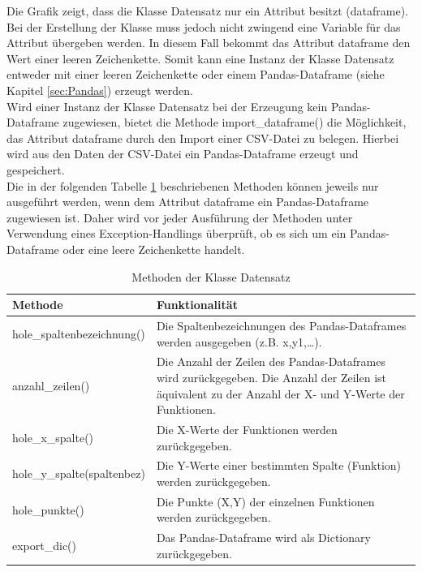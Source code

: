 \documentclass[11pt,a4paper]{scrreprt}
\begin{document}
Die Grafik zeigt, dass die Klasse Datensatz nur ein Attribut besitzt (dataframe). Bei der Erstellung der Klasse muss jedoch nicht zwingend eine Variable für das Attribut übergeben werden. In diesem Fall bekommt das Attribut dataframe den Wert einer leeren Zeichenkette. Somit kann eine Instanz der Klasse Datensatz entweder mit einer leeren Zeichenkette oder einem Pandas-Dataframe (siehe Kapitel \ref{sec:Pandas}) erzeugt werden. \\
Wird einer Instanz der Klasse Datensatz bei der Erzeugung kein Pandas-Dataframe zugewiesen, bietet die Methode import\_dataframe() die Möglichkeit, das Attribut dataframe durch den Import einer CSV-Datei zu belegen. Hierbei wird aus den Daten der CSV-Datei ein Pandas-Dataframe erzeugt und gespeichert.\\
Die in der folgenden Tabelle \ref{tab:Klasse_Datensatz} beschriebenen Methoden können jeweils nur ausgeführt werden, wenn dem Attribut dataframe ein Pandas-Dataframe zugewiesen ist. Daher wird vor jeder Ausführung der Methoden unter Verwendung eines Exception-Handlings überprüft, ob es sich um ein Pandas-Dataframe oder eine leere Zeichenkette handelt. 
\begin{table}[!h]
\centering
\begin{tabularx}{0.95\textwidth}{|l|X|}
\hline
\textbf{Methode} & \textbf{Funktionalität}\\
\hline
hole\_spaltenbezeichnung() & Die Spaltenbezeichnungen des Pandas-Dataframes werden ausgegeben (z.B. x,y1,…).\\
\hline
anzahl\_zeilen() & Die Anzahl der Zeilen des Pandas-Dataframes wird zurückgegeben. Die Anzahl der Zeilen ist äquivalent zu der Anzahl der X- und Y-Werte der Funktionen.\\
\hline
hole\_x\_spalte() & Die X-Werte der Funktionen werden zurückgegeben.\\
\hline
hole\_y\_spalte(spaltenbez) & Die Y-Werte einer bestimmten Spalte (Funktion) werden zurückgegeben.\\
\hline
hole\_punkte() & Die Punkte (X,Y)  der einzelnen Funktionen werden zurückgegeben. \\
\hline
export\_dic() & Das Pandas-Dataframe wird als Dictionary zurückgegeben.\\
\hline
\end{tabularx}
\caption{Methoden der Klasse Datensatz}
\label{tab:Klasse_Datensatz}
\end{table}
\end{document}
